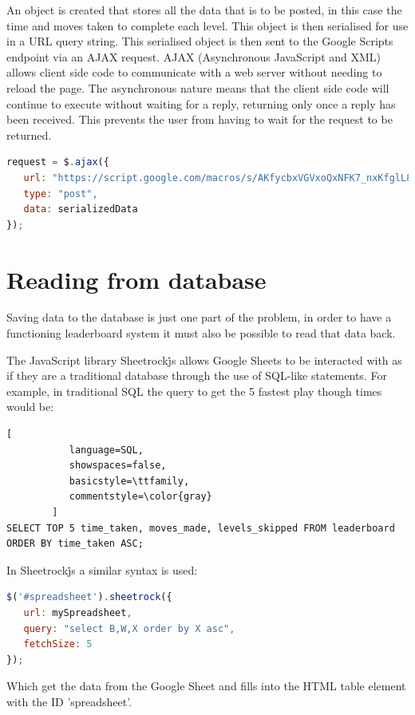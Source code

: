 \documentclass[12pt,a4paper]{report}
\begin{document}
An object is created that stores all the data that is to be posted, in this case the time and moves taken to complete each level. This object is then serialised for use in a URL query string. This serialised object is then sent to the Google Scripts endpoint via an AJAX request. AJAX (Asynchronous JavaScript and XML) allows client side code to communicate with a web server without needing to reload the page. The asynchronous nature means that the client side code will continue to execute without waiting for a reply, returning only once a reply has been received. This prevents the user from having to wait for the request to be returned.


\begin{lstlisting}[language=JavaScript]
request = $.ajax({
   url: "https://script.google.com/macros/s/AKfycbxVGVxoQxNFK7_nxKfglL8yLNUmdPwP2e9j8IMO6JY5wzLEdSE/exec",
   type: "post",
   data: serializedData
});
\end{lstlisting}

\section{Reading from database}
Saving data to the database is just one part of the problem, in order to have a functioning leaderboard system it must also be possible to read that data back.

The JavaScript library Sheetrock\.js allows Google Sheets to be interacted with as if they are a traditional database through the use of SQL-like statements.
For example, in traditional SQL the query to get the 5 fastest play though times would be:

\begin{lstlisting}[
           language=SQL,
           showspaces=false,
           basicstyle=\ttfamily,
           commentstyle=\color{gray}
        ]
SELECT TOP 5 time_taken, moves_made, levels_skipped FROM leaderboard ORDER BY time_taken ASC;
\end{lstlisting}

In Sheetrock\.js a similar syntax is used:

\begin{lstlisting}[language=JavaScript]
$('#spreadsheet').sheetrock({
   url: mySpreadsheet,
   query: "select B,W,X order by X asc",
   fetchSize: 5
});
\end{lstlisting}

Which get the data from the Google Sheet and fills into the HTML table element with the ID 'spreadsheet'.
\end{document}
